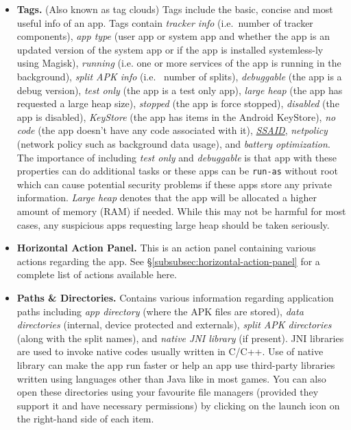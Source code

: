 \begin{itemize}
    \item \textbf{Tags.} (Also known as tag clouds) Tags include the basic, concise and most useful info of an app.
    Tags contain \textit{tracker info} (i.e.\ number of tracker components), \textit{app type} (user app or system app
    and whether the app is an updated version of the system app or if the app is installed systemless-ly using Magisk),
    \textit{running} (i.e. one or more services of the app is running in the background), \textit{split APK info} (i.e.
    \ number of splits), \textit{debuggable} (the app is a debug version), \textit{test only} (the app is a test only
    app), \textit{large heap} (the app has requested a large heap size), \textit{stopped} (the app is force stopped),
    \textit{disabled} (the app is disabled), \textit{KeyStore} (the app has items in the Android KeyStore),
    \textit{no code} (the app doesn't have any code associated with it), \hyperref[sec:terminologies]{\textit{SSAID}},
    \textit{netpolicy} (network policy such as background data usage), and \textit{battery optimization}.
    The importance of including \textit{test only} and \textit{debuggable} is that app with these properties can do
    additional tasks or these apps can be \texttt{run-as} without root which can cause potential security problems
    if these apps store any private information.
    \textit{Large heap} denotes that the app will be allocated a higher amount of memory (RAM) if needed.
    While this may not be harmful for most cases, any suspicious apps requesting large heap should be taken seriously.

    \item \textbf{Horizontal Action Panel.} This is an action panel containing various actions regarding the app. See
    §\cref{subsubsec:horizontal-action-panel} for a complete list of actions available here.

    \item \textbf{Paths \& Directories.} Contains various information regarding application paths including \textit{app
    directory} (where the APK files are stored), \textit{data directories} (internal, device protected and externals),
    \textit{split APK directories} (along with the split names), and \textit{native JNI library} (if present). JNI
    libraries are used to invoke native codes usually written in C/C++. Use of native library can make the app run
    faster or help an app use third-party libraries written using languages other than Java like in most games. You can
    also open these directories using your favourite file managers (provided they support it and have necessary
    permissions) by clicking on the launch icon on the right-hand side of each item.


\end{itemize}

